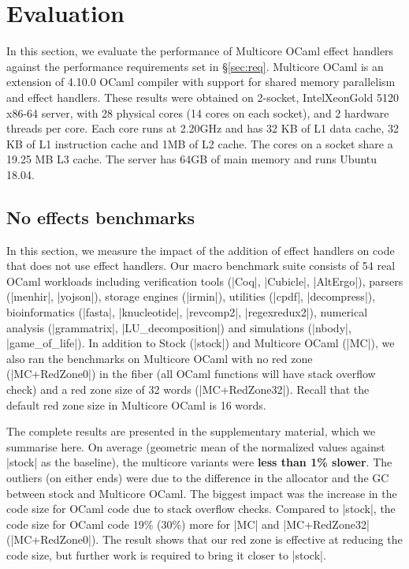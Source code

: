 \documentclass[sigplan,10pt,review,anonymous]{acmart}\settopmatter{printfolios=true,printccs=false,printacmref=false}
\begin{document}
\vspace{-3mm}
\section{Evaluation}
\label{sec:eval}

In this section, we evaluate the performance of Multicore OCaml effect handlers
against the performance requirements set in \S\ref{sec:req}. Multicore OCaml is
an extension of 4.10.0 OCaml compiler with support for shared memory
parallelism and effect handlers. These results were obtained on 2-socket,
Intel\textregistered Xeon\textregistered Gold 5120 x86-64 server, with 28
physical cores (14 cores on each socket), and 2 hardware threads per core. Each
core runs at 2.20GHz and has 32 KB of L1 data cache, 32 KB of L1 instruction
cache and 1MB of L2 cache. The cores on a socket share a 19.25 MB L3 cache. The
server has 64GB of main memory and runs Ubuntu 18.04.

\vspace{-3mm}
\subsection{No effects benchmarks}

In this section, we measure the impact of the addition of effect handlers on
code that does not use effect handlers. Our macro benchmark suite consists of
54 real OCaml workloads including verification tools (|Coq|, |Cubicle|,
|AltErgo|), parsers (|menhir|, |yojson|), storage engines (|irmin|), utilities
(|cpdf|, |decompress|), bioinformatics (|fasta|, |knucleotide|, |revcomp2|,
|regexredux2|), numerical analysis (|grammatrix|, |LU_decomposition|) and
simulations (|nbody|, |game_of_life|). In addition to Stock (|stock|) and
Multicore OCaml (|MC|), we also ran the benchmarks on Multicore OCaml with no
red zone (|MC+RedZone0|) in the fiber (all OCaml functions will have stack
overflow check) and a red zone size of 32 words (|MC+RedZone32|). Recall that
the default red zone size in Multicore OCaml is 16 words.

The complete results are presented in the supplementary material, which we
summarise here. On average (geometric mean of the normalized values against
|stock| as the baseline), the multicore variants were \textbf{less than 1\%
slower}. The outliers (on either ends) were due to the difference in the
allocator and the GC between stock and Multicore OCaml. The biggest impact was
the increase in the code size for OCaml code due to stack overflow checks.
Compared to |stock|, the code size for OCaml code 19\% (30\%) more for |MC| and
|MC+RedZone32| (|MC+RedZone0|). The result shows that our red zone is effective
at reducing the code size, but further work is required to bring it closer to
|stock|.
\end{document}
